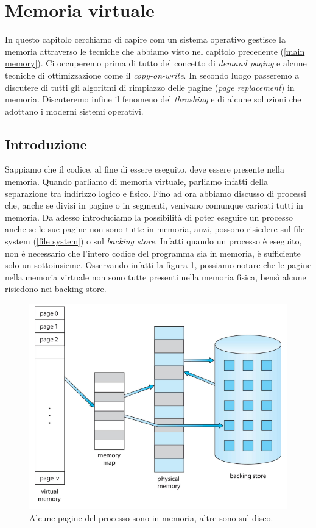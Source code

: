 \pagebreak
\section{Memoria virtuale}\label{virtual memory}
In questo capitolo cerchiamo di capire com un sistema operativo gestisce la memoria attraverso le tecniche che abbiamo visto nel capitolo precedente (\ref{main memory}). Ci occuperemo prima di tutto del concetto di \textit{demand paging} e alcune tecniche di ottimizzazione come il \textit{copy-on-write}. In secondo luogo passeremo a discutere di tutti gli algoritmi di rimpiazzo delle pagine (\textit{page replacement}) in memoria. Discuteremo infine il fenomeno del \textit{thrashing} e di alcune soluzioni che adottano i moderni sistemi operativi.

% 
\subsection{Introduzione}
Sappiamo che il codice, al fine di essere eseguito, deve essere presente nella memoria. Quando parliamo di memoria virtuale, parliamo infatti della separazione tra indirizzo logico e fisico. Fino ad ora abbiamo discusso di processi che, anche se divisi in pagine o in segmenti, venivano comunque caricati tutti in memoria. Da adesso introduciamo la possibilità di poter eseguire un processo anche se le sue pagine non sono tutte in memoria, anzi, possono risiedere sul file system (\ref{file system}) o sul \textit{backing store}. Infatti quando un processo è eseguito, non è necessario che l'intero codice del programma sia in memoria, è sufficiente solo un sottoinsieme. Osservando infatti la figura \ref{fig:virtual_memory}, possiamo notare che le pagine nella memoria virtuale non sono tutte presenti nella memoria fisica, bensì alcune risiedono nei backing store.
\begin{figure}[h]
    \centering
    \includegraphics[width = .6\textwidth]{../res/imgs/virtual memory/virtual_memory.png}
    \caption{Alcune pagine del processo sono in memoria, altre sono sul disco.}
    \label{fig:virtual_memory}
\end{figure}

